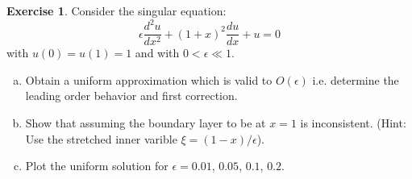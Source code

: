 \documentclass[12pt]{article}
\theoremstyle{definition}
\newtheorem{exer}{Exercise}
\theoremstyle{remark}
\begin{document}
\begin{exer}

Consider the singular equation:
\begin{equation*}
    \epsilon \frac{d^{2} u}{dx^{2}} + (1 + x)^{2} \frac{d u}{d x} + u = 0
\end{equation*}
with $u(0) = u(1) = 1$ and with $0 < \epsilon \ll 1$.
\begin{enumerate}[(a)]
    \item Obtain a uniform approximation which is valid to $O(\epsilon)$ i.e. determine the leading order behavior and first correction.
    \item Show that assuming the boundary layer to be at $x = 1$ is inconsistent. (Hint: Use the stretched inner varible  $\xi = (1 - x) / \epsilon$).
    \item Plot the uniform solution for $\epsilon = 0.01$, $0.05$,  $0.1$,  $0.2$.
\end{enumerate}
\end{exer}
\end{document}
